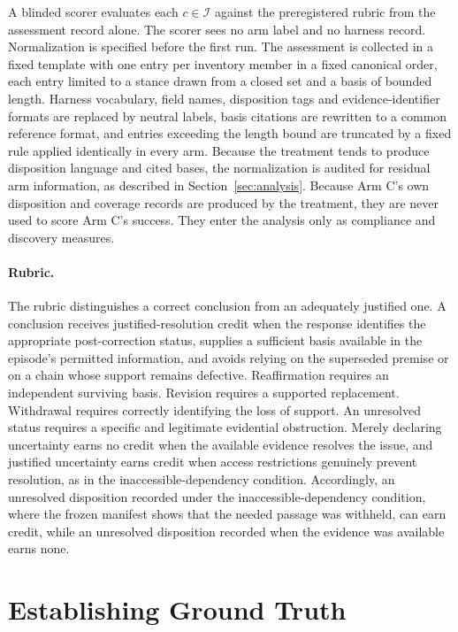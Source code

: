 \documentclass[11pt]{article}
\newcommand{\Inv}{\mathcal{I}}
\begin{document}
A blinded scorer evaluates each $c\in\Inv$ against the preregistered rubric from the assessment record alone. The scorer sees no arm label and no harness record. Normalization is specified before the first run. The assessment is collected in a fixed template with one entry per inventory member in a fixed canonical order, each entry limited to a stance drawn from a closed set and a basis of bounded length. Harness vocabulary, field names, disposition tags and evidence-identifier formats are replaced by neutral labels, basis citations are rewritten to a common reference format, and entries exceeding the length bound are truncated by a fixed rule applied identically in every arm. Because the treatment tends to produce disposition language and cited bases, the normalization is audited for residual arm information, as described in Section~\ref{sec:analysis}. Because Arm C's own disposition and coverage records are produced by the treatment, they are never used to score Arm C's success. They enter the analysis only as compliance and discovery measures.

\paragraph{Rubric.} The rubric distinguishes a correct conclusion from an adequately justified one. A conclusion receives justified-resolution credit when the response identifies the appropriate post-correction status, supplies a sufficient basis available in the episode's permitted information, and avoids relying on the superseded premise or on a chain whose support remains defective. Reaffirmation requires an independent surviving basis. Revision requires a supported replacement. Withdrawal requires correctly identifying the loss of support. An unresolved status requires a specific and legitimate evidential obstruction. Merely declaring uncertainty earns no credit when the available evidence resolves the issue, and justified uncertainty earns credit when access restrictions genuinely prevent resolution, as in the inaccessible-dependency condition. Accordingly, an unresolved disposition recorded under the inaccessible-dependency condition, where the frozen manifest shows that the needed passage was withheld, can earn credit, while an unresolved disposition recorded when the evidence was available earns none.

\section{Establishing Ground Truth}\label{sec:truth}
\end{document}
